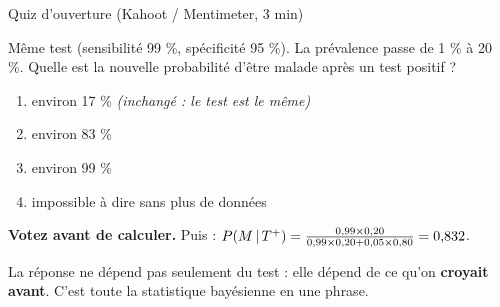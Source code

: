 \begin{frame}{Quiz d'ouverture (Kahoot / Mentimeter, 3 min)}
\begin{qbox}
Même test (sensibilité 99 \%, spécificité 95 \%). La prévalence passe de 1 \% à 20 \%.
Quelle est la nouvelle probabilité d'être malade après un test positif ?
\vspace{2mm}
\begin{enumerate}
  \item[(A)] environ 17 \% \quad \textit{(inchangé : le test est le même)}
  \item[(B)] environ 83 \% \quad \checkmark
  \item[(C)] environ 99 \%
  \item[(D)] impossible à dire sans plus de données
\end{enumerate}
\vspace{2mm}
\textcolor{byBlue}{\textbf{Votez avant de calculer.}} Puis :
$P(M \,\vert\, T^+) = \frac{0{,}99 \times 0{,}20}{0{,}99 \times 0{,}20 + 0{,}05 \times 0{,}80} = 0{,}832$.
\end{qbox}
\vspace{1mm}
\begin{kbox}
La réponse ne dépend pas seulement du test : elle dépend de ce qu'on
\textbf{croyait avant}. C'est toute la statistique bayésienne en une phrase.
\end{kbox}
\end{frame}

